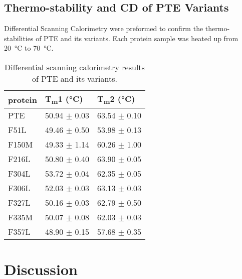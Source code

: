 \begin{refsection}
\subsection{Thermo-stability and CD of PTE Variants}

Differential Scanning Calorimetry were preformed to confirm the
thermo-stabilities of PTE and its variants. Each protein sample was heated up
from \SI{20}{\celsius} to \SI{70}{\celsius}. 

\begin{table}
    \caption{Differential scanning calorimetry results of PTE and its variants.} 
    \label{tal:dsc-result}
    \centering
    \begin{tabular}{lll}
    \hline
    protein & T\textsubscript{m}1 (\si{\celsius}) & T\textsubscript{m}2 (\si{\celsius})\\
    \hline
    PTE    & 50.94 $\pm$ 0.03  & 63.54 $\pm$ 0.10 \\
    F51L & 49.46 $\pm$ 0.50 & 53.98 $\pm$ 0.13 \\
    F150M & 49.33 $\pm$ 1.14 & 60.26 $\pm$ 1.00\\
    F216L & 50.80 $\pm$ 0.40 & 63.90 $\pm$ 0.05 \\
    F304L & 53.72 $\pm$ 0.04 & 62.35 $\pm$ 0.05 \\
    F306L & 52.03 $\pm$ 0.03 & 63.13 $\pm$ 0.03 \\
    F327L & 50.16 $\pm$ 0.03 & 62.79 $\pm$ 0.50 \\
    F335M & 50.07 $\pm$ 0.08 & 62.03 $\pm$ 0.03 \\
    F357L & 48.90 $\pm$ 0.15 & 57.68 $\pm$ 0.35 \\

    \hline      
    \end{tabular}
\end{table}

\section{Discussion}

\printbibliography[heading=subbibliography]

\end{refsection}

